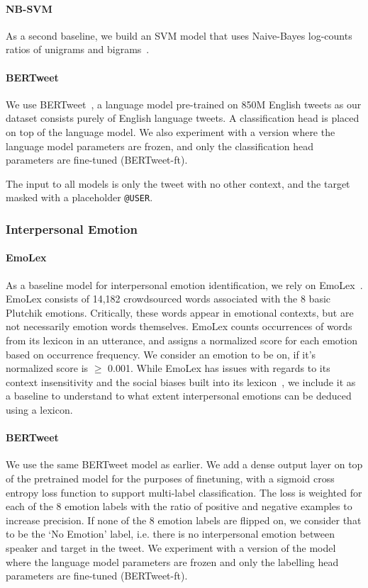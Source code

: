 \paragraph{NB-SVM} As a second baseline, we build an SVM model that uses Naive-Bayes log-counts ratios of unigrams and bigrams~\citep{wang-manning-2012-baselines}.


\paragraph{BERTweet} We use BERTweet~\citep{nguyen_bertweet_2020}, a language model pre-trained on 850M English tweets as our dataset consists purely of English language tweets. A classification head is placed on top of the language model. We also experiment with a version where the language model parameters are frozen, and only the classification head parameters are fine-tuned (BERTweet-ft).

The input to all models is only the tweet with no other context, and the target masked with a placeholder \texttt{@USER}.

\subsubsection{Interpersonal Emotion}

\paragraph{EmoLex} As a baseline model for interpersonal emotion identification, we rely on EmoLex~\citep{Mohammad2013CROWDSOURCINGAW}. EmoLex consists of 14,182 crowdsourced words associated with the 8 basic Plutchik emotions. Critically, these words appear in emotional contexts, but are not necessarily emotion words themselves. EmoLex counts occurrences of words from its lexicon in an utterance, and assigns a normalized score for each emotion based on occurrence frequency. We consider an emotion to be on, if it's normalized score is $\geq$ 0.001. While EmoLex has issues with regards to its context insensitivity and the social biases built into its lexicon~\citep{zad-etal-2021-hell}, we include it as a baseline to understand to what extent interpersonal emotions can be deduced using a lexicon.


\paragraph{BERTweet} We use the same BERTweet model as earlier. We add a dense output layer on top of the pretrained model for the purposes of finetuning, with a sigmoid cross entropy loss function to support multi-label classification. The loss is weighted for each of the 8 emotion labels with the ratio of positive and negative examples to increase precision. If none of the 8 emotion labels are flipped on, we consider that to be the `No Emotion' label, i.e. there is no interpersonal emotion between speaker and target in the tweet. We experiment with a version of the model where the language model parameters are frozen and only the labelling head parameters are fine-tuned (BERTweet-ft).

